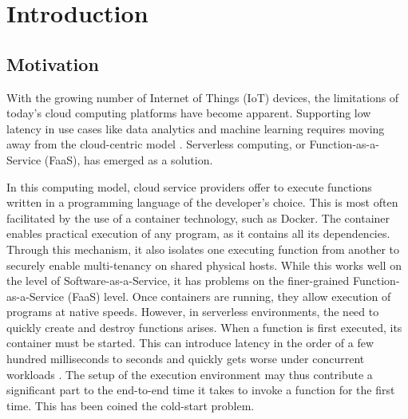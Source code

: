 \chapter{Introduction}
\label{chapter:introduction}

\section{Motivation}

With the growing number of Internet of Things (IoT) devices, the limitations of today's cloud computing platforms have become apparent. Supporting low latency in use cases like data analytics and machine learning requires moving away from the cloud-centric model \cite{Nastic2017, Rausch2019}. Serverless computing, or Function-as-a-Service (FaaS), has emerged as a solution.


In this computing model, cloud service providers offer to execute functions written in a programming language of the developer's choice. This is most often facilitated by the use of a container technology, such as Docker. The container enables practical execution of any program, as it contains all its dependencies. Through this mechanism, it also isolates one executing function from another to securely enable multi-tenancy on shared physical hosts. While this works well on the level of Software-as-a-Service, it has problems on the finer-grained Function-as-a-Service (FaaS) level. Once containers are running, they allow execution of programs at native speeds. However, in serverless environments, the need to quickly create and destroy functions arises. When a function is first executed, its container must be started. This can introduce latency in the order of a few hundred milliseconds to seconds \cite{Manner2018, Wang2018} and quickly gets worse under concurrent workloads \cite{Mohan2019}. The setup of the execution environment may thus contribute a significant part to the end-to-end time it takes to invoke a function for the first time. This has been coined the cold-start problem.

